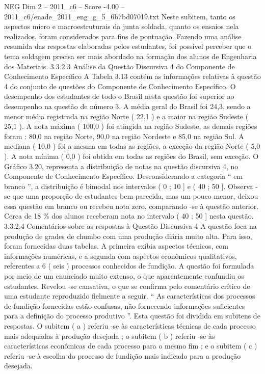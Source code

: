 \begin{textsample}{NEG Dim 2 – 2011\_c6 – Score -4.00 – 2011\_c6/enade\_2011\_eng\_g\_5\_6b7bd07019.txt}
Neste subitem, tanto os aspectos micro e macroestruturais da junta soldada, quanto os ensaios nela realizados, foram considerados para fins de pontuação.
Fazendo uma análise resumida das respostas elaboradas pelos estudantes, foi possível perceber que o tema soldagem precisa ser mais abordado na formação dos alunos de Engenharia dos Materiais. 3.3.2.3 Análise da Questão Discursiva 4 do Componente de Conhecimento Específico A Tabela 3.13 contém as informações relativas à questão 4 do conjunto de questões do Componente de Conhecimento Específico.
O desempenho dos estudantes de todo o Brasil nesta questão foi superior ao desempenho na questão de número 3.
A média geral do Brasil foi 24,3, sendo a menor média registrada na região Norte ( 22,1 ) e a maior na região Sudeste ( 25,1 ).
A nota máxima ( 100,0 ) foi atingida na região Sudeste, as demais regiões foram : 80,0 na região Norte, 90,0 na região Nordeste e 85,0 na região Sul.
A mediana ( 10,0 ) foi a mesma em todas as regiões, a exceção da região Norte ( 5,0 ).
A nota mínima ( 0,0 ) foi obtida em todas as regiões do Brasil, sem exceção.
O Gráfico 3.20, representa a distribuição de notas na questão discursiva 4, no Componente de Conhecimento Específico.
Desconsiderando a categoria “ em branco ”, a distribuição é bimodal nos intervalos ( 0 ; 10 ] e ( 40 ; 50 ].
Observa -se que uma proporção de estudantes bem parecida, mas um pouco menor, deixou essa questão em branco ou recebeu nota zero, comparando -se à questão anterior.
Cerca de 18 \% dos alunos receberam nota no intervalo ( 40 ; 50 ] nesta questão. 3.3.2.4 Comentários sobre as respostas à Questão Discursiva 4 A questão foca na produção de grades de chumbo com uma produção diária muito alta.
Para isso, foram fornecidas duas tabelas.
A primeira exibia aspectos técnicos, com informações numéricas, e a segunda com aspectos econômicos qualitativos, referentes a 6 ( seis ) processos conhecidos de fundição.
A questão foi formulada por meio de um enunciado muito extenso, o que aparentemente confundiu os estudantes.
Revelou -se cansativa, o que se confirma pelo comentário crítico de uma estudante reproduzido fielmente a seguir. “ As características dos processos de fundição fornecidas estão confusas, não fornecendo informações suficientes para a definição do processo produtivo ”.
Esta questão foi dividida em subitens de respostas.
O subitem ( a ) referiu -se às características técnicas de cada processo mais adequadas à produção desejada ; o subitem ( b ) referiu -se às características econômicas de cada processo para o mesmo fim ; e o subitem ( c ) referiu -se à escolha do processo de fundição mais indicado para a produção desejada.

\end{textsample}
